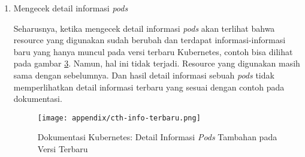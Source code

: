 \begin{enumerate}
\begin{enumerate}
            Hal ini bisa dilakukan dengan mengeksekusi perintah \textit{patch pod}. Perintah ini bisa dilihat pada dokumentasi: \url{https://kubernetes.io/docs/tasks/configure-pod-container/resize-container-resources/}.

            Saat hal ini dijalankan terdapat pesan eror yang mengatakan bahwa fitur \textit{patch} tersebut hanya bisa dilakukan selain resource, lihat gambar \ref{fig:appendix1-eksperimen-gagal}. Padahal, inisiasi eksperimen sudah disesuaikan dengan \textit{requirement} yang disebutkan pada dokumentasi, lihat gambar \ref{fig:appendix1-kube-doc}.

            \begin{figure}[h]
                \centering
                \texttt{[image: appendix/eksperimen-gagal.png]}
                \caption{Pesan Error saat Melakukan \textit{Patch} pada \textit{Pods}}
                \label{fig:appendix1-eksperimen-gagal}
            \end{figure}

            \begin{figure}[h]
                \centering
                \texttt{[image: appendix/kubernetes-docs-resize.png]}
                \caption{Dokumentasi Kubernetes: \textit{In-place Resource Resize}}
                \label{fig:appendix1-kube-doc}
            \end{figure}

            \item Mengecek detail informasi \textit{pods}
            
            Seharusnya, ketika mengecek detail informasi \textit{pods} akan terlihat bahwa resource yang digunakan sudah berubah dan terdapat informasi-informasi baru yang hanya muncul pada versi terbaru Kubernetes, contoh bisa dilihat pada gambar \ref{fig:appendix1-info-terbaru}. Namun, hal ini tidak terjadi. Resource yang digunakan masih sama dengan sebelumnya. Dan hasil detail informasi sebuah \textit{pods} tidak memperlihatkan detail informasi terbaru yang sesuai dengan contoh pada dokumentasi.

            \begin{figure}[h]
                \centering
                \texttt{[image: appendix/cth-info-terbaru.png]}
                \caption{Dokumentasi Kubernetes: Detail Informasi \textit{Pods} Tambahan pada Versi Terbaru}
                \label{fig:appendix1-info-terbaru}
            \end{figure}
        \end{enumerate}


\end{enumerate}
